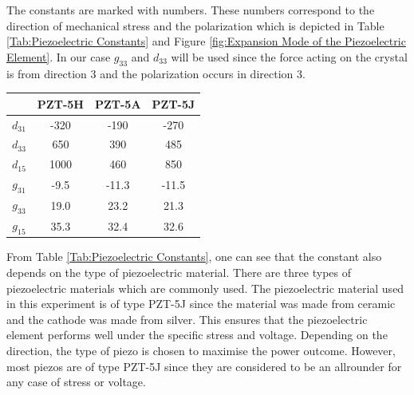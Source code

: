\begin{minipage}{0.66\textwidth}
    The constants are marked with numbers. These numbers correspond to the direction of mechanical stress and the polarization which is depicted in Table \ref{Tab:Piezoelectric Constants} and Figure \ref{fig:Expansion Mode of the Piezoelectric Element}. In our case $g_{33}$ and $d_{33}$ will be used since the force acting on the crystal is from direction 3 and the polarization occurs in direction 3.\\ 
\end{minipage}
\begin{minipage}{0.5\textwidth}
    \center
        \begin{tabular}{|c|c|c|c|}
            \hline
            & PZT-5H & PZT-5A & PZT-5J \\
            \hline
            \hline
            $d_{31}$ & -320 & -190 & -270 \\
            \hline
            $d_{33}$ & 650 & 390 & 485 \\
            \hline
            $d_{15}$ & 1000 & 460 & 850 \\
            \hline
            $g_{31}$ & -9.5 & -11.3 & -11.5 \\
            \hline
            $g_{33}$ & 19.0 & 23.2 & 21.3 \\
            \hline
            $g_{15}$ & 35.3 & 32.4 & 32.6 \\
            \hline
        \end{tabular}
        \label{Tab:Piezoelectric Constants}
\end{minipage}
\begin{minipage}{0.5\textwidth}
    From Table \ref{Tab:Piezoelectric Constants}, one can see that the constant also depends on the type of piezoelectric material. There are three types of piezoelectric materials which are commonly used. The piezoelectric material used in this experiment is of type PZT-5J since the material was made from ceramic and the cathode was made from silver. This ensures that the piezoelectric element performs well under the specific stress and voltage. Depending on the direction, the type of piezo is chosen to maximise the power outcome. However, most piezos are of type PZT-5J since they are considered to be an allrounder for any case of stress or voltage.\\
\end{minipage}
